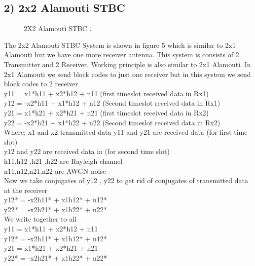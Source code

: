\documentclass[12pt]{report}
\begin{document}
\subsection*{2) 2x2 Alamouti STBC}
\begin{figure}[!hbt]
\begin{center}
		\caption{2X2 Alamouti STBC  .}
		\label{fig:tf_plot}
		\end{center}
	\end{figure}
    The 2x2 Alamouti STBC System is shown in figure 5
which is similar to 2x1 Alamouti but we have one more
receiver antenna. This system is consists of 2 Transmitter
and 2 Receiver. Working principle is also similar to 2x1
Alamouti. In 2x1 Alamouti we send block codes to just
one receiver but in this system we send block codes to 2
receiver\\
y11 = x1*h11 + x2*h12 + n11 (first timeslot received data in Rx1) \\
y12 = -x2*h11 + x1*h12 + n12 (Second timeslot received data in Rx1)\\
y21 = x1*h21 + x2*h21 + n21 (first timeslot received data in Rx2)\\
 y22 = -x2*h21 + x1*h22 + n22 (Second timeslot received data in Rx2)\\
 Where;
x1 and x2 transmitted data
y11 and y21 are received data (for first time slot)\\
y12 and y22 are received data in (for second time slot)\\
h11,h12 ,h21 ,h22 are Rayleigh channel\\
n11,n12,n21,n22 are AWGN noise\\
Now we take conjugates of y12 , y22 to get rid of
conjugates of transmitted data at the receiver\\
y12* = -x2h11* + x1h12* + n12*\\
y22* = -x2h21* + x1h22* + n22*\\
We write  together to all\\
y11 = x1*h11 + x2*h12 + n11\\
y12* = -x2h11* + x1h12* + n12*\\
y21 = x1*h21 + x2*h21 + n21\\ 
y22* = -x2h21* + x1h22* + n22*\\ \\ \\ \\ \\ 
\end{document}
